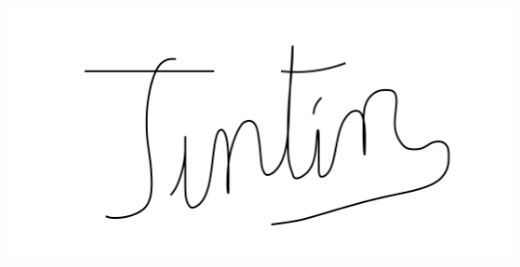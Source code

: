 \documentclass[12pt,a4paper]{article}
\begin{document}
\medskip

\begin{center}
\includegraphics[width=0.3\linewidth]{Signature.PNG}
\end{center}
\end{document}
